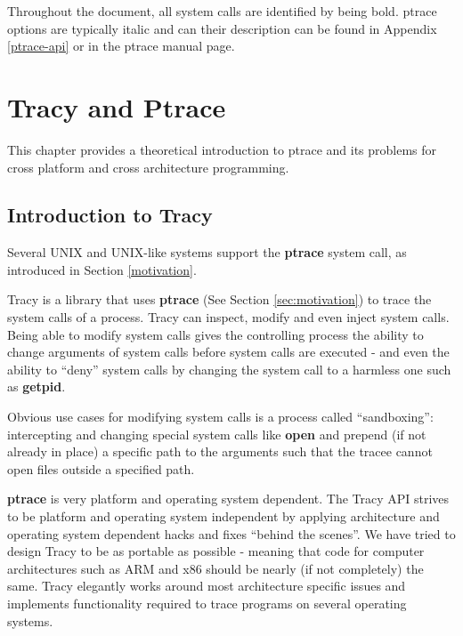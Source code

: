 \documentclass[a4paper, 10pt]{report}
\begin{document}
Throughout the document, all system calls are identified by being bold.
ptrace options are typically italic and can their description can be found in
Appendix \ref{ptrace-api} or in the ptrace manual page.

\chapter{Tracy and Ptrace}

This chapter provides a theoretical introduction to ptrace and its problems for
cross platform and cross architecture programming.

\section{Introduction to Tracy}

Several UNIX and UNIX-like systems support the \textbf{ptrace} system call, as
introduced in Section \ref{motivation}.


Tracy is a library that uses \textbf{ptrace} (See Section \ref{sec:motivation})
to trace the system calls of a process. Tracy can inspect, modify and even
inject system calls. Being able to modify system calls gives the controlling
process the ability to change arguments of system calls before system calls
are executed - and even the ability to ``deny'' system calls by changing the
system call to a harmless one such as \textbf{getpid}.

Obvious use cases for modifying system calls is a process
called ``sandboxing'': intercepting and changing special system calls like
\textbf{open} and prepend (if not already in place) a specific path to the
arguments such that the tracee cannot open files outside a specified path.

\textbf{ptrace} is very platform and operating system dependent.
The Tracy API strives to be platform and operating system independent by
applying architecture and operating system dependent hacks and fixes
``behind the scenes''. We have tried to design Tracy to be as portable as
possible - meaning that code for computer architectures such as ARM and
x86 should be nearly (if not completely) the same.
Tracy elegantly works around most architecture specific issues and implements
functionality required to trace programs on several operating systems.
\end{document}
